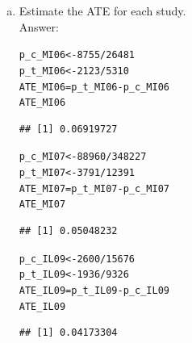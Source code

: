 \documentclass[11pt,notitlepage]{article}\usepackage[]{graphicx}\usepackage[]{color}
\makeatletter
\newcommand{\hlnum}[1]{\textcolor[rgb]{0.686,0.059,0.569}{#1}}%
\newcommand{\hlopt}[1]{\textcolor[rgb]{0,0,0}{#1}}%
\newcommand{\hlstd}[1]{\textcolor[rgb]{0.345,0.345,0.345}{#1}}%
\newcommand{\hlkwb}[1]{\textcolor[rgb]{0.69,0.353,0.396}{#1}}%
\newenvironment{kframe}{%
 \def\at@end@of@kframe{}%
 \ifinner\ifhmode%
  \def\at@end@of@kframe{\end{minipage}}%
  \begin{minipage}{\columnwidth}%
 \fi\fi%
 \def\FrameCommand##1{\hskip\@totalleftmargin \hskip-\fboxsep
 \colorbox{shadecolor}{##1}\hskip-\fboxsep
     \hskip-\linewidth \hskip-\@totalleftmargin \hskip\columnwidth}%
 \MakeFramed {\advance\hsize-\width
   \@totalleftmargin\z@ \linewidth\hsize
   \@setminipage}}%
 {\par\unskip\endMakeFramed%
 \at@end@of@kframe}
\newenvironment{knitrout}{}{} %
\makeatother
\begin{document}
\begin{enumerate}[a)]
\item Estimate the ATE for each study.\\
Answer:\\

\begin{knitrout}
\color{fgcolor}\begin{kframe}
\begin{alltt}
\hlstd{p_c_MI06} \hlkwb{<-} \hlnum{8755}\hlopt{/}\hlnum{26481}
\hlstd{p_t_MI06} \hlkwb{<-} \hlnum{2123}\hlopt{/}\hlnum{5310}
\hlstd{ATE_MI06} \hlkwb{=} \hlstd{p_t_MI06} \hlopt{-} \hlstd{p_c_MI06}
\hlstd{ATE_MI06}
\end{alltt}
\begin{verbatim}
## [1] 0.06919727
\end{verbatim}
\begin{alltt}
\hlstd{p_c_MI07} \hlkwb{<-} \hlnum{88960}\hlopt{/}\hlnum{348227}
\hlstd{p_t_MI07} \hlkwb{<-} \hlnum{3791}\hlopt{/}\hlnum{12391}
\hlstd{ATE_MI07} \hlkwb{=} \hlstd{p_t_MI07} \hlopt{-} \hlstd{p_c_MI07}
\hlstd{ATE_MI07}
\end{alltt}
\begin{verbatim}
## [1] 0.05048232
\end{verbatim}
\begin{alltt}
\hlstd{p_c_IL09} \hlkwb{<-} \hlnum{2600}\hlopt{/}\hlnum{15676}
\hlstd{p_t_IL09} \hlkwb{<-} \hlnum{1936}\hlopt{/}\hlnum{9326}
\hlstd{ATE_IL09} \hlkwb{=}  \hlstd{p_t_IL09} \hlopt{-} \hlstd{p_c_IL09}
\hlstd{ATE_IL09}
\end{alltt}
\begin{verbatim}
## [1] 0.04173304
\end{verbatim}
\end{kframe}
\end{knitrout}




\end{enumerate}
\end{document}
